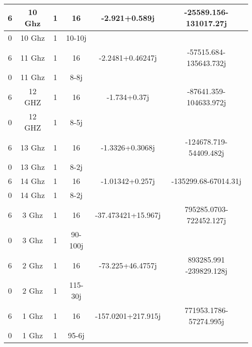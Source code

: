 \documentclass[12pt,letterpaper]{report}
\numberwithin{equation}{section}
\begin{document}
\begin{table}[H]
\begin{tabular}{@{}|c|c|c|c|c|c|@{}}
		6              & 10 Ghz                  & 1                 & 16                 & -2.921+0.589j      & -25589.156-131017.27j   \\ \midrule
		0              & 10 Ghz                  & 1                 & 10-10j             &                    &                         \\ \midrule
		6              & 11 Ghz                  & 1                 & 16                 & -2.2481+0.46247j   & -57515.684-135643.732j  \\ \midrule
		0              & 11 Ghz                  & 1                 & 8-8j               &                    &                         \\ \midrule
		6              & 12 GHZ                  & 1                 & 16                 & -1.734+0.37j       & -87641.359-104633.972j  \\ \midrule
		0              & 12 GHZ                  & 1                 & 8-5j               &                    &                         \\ \midrule
		6              & 13 Ghz                  & 1                 & 16                 & -1.3326+0.3068j    & -124678.719-54409.482j  \\ \midrule
		0              & 13 Ghz                  & 1                 & 8-2j               &                    &                         \\ \midrule
		6              & 14 Ghz                  & 1                 & 16                 & -1.01342+0.257j    & -135299.68-67014.31j    \\ \midrule
		0              & 14 Ghz                  & 1                 & 8-2j               &                    &                         \\ \midrule
		6              & 3 Ghz                   & 1                 & 16                 & -37.473421+15.967j & 795285.0703-722452.127j \\ \midrule
		0              & 3 Ghz                   & 1                 & 90-100j            &                    &                         \\ \midrule
		6              & 2 Ghz                   & 1                 & 16                 & -73.225+46.4757j   & 893285.991 -239829.128j \\ \midrule
		0              & 2 Ghz                   & 1                 & 115-30j            &                    &                         \\ \midrule
		6              & 1 Ghz                   & 1                 & 16                 & -157.0201+217.915j & 771953.1786-57274.995j  \\ \midrule
		0              & 1 Ghz                   & 1                 & 95-6j              &                    &                         \\ \bottomrule
	\end{tabular}
\end{table}
\end{document}
